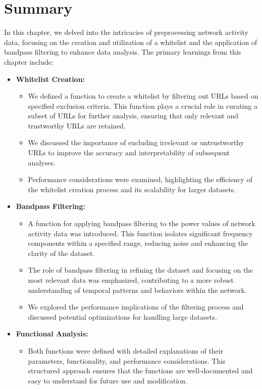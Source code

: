 \section{Summary}

In this chapter, we delved into the intricacies of preprocessing network activity data, focusing on the creation and utilization of a whitelist and the application of bandpass filtering to enhance data analysis. The primary learnings from this chapter include:

\begin{itemize}
    \item \textbf{Whitelist Creation:}
    \begin{itemize}
        \item We defined a function to create a whitelist by filtering out URLs based on specified exclusion criteria. This function plays a crucial role in curating a subset of URLs for further analysis, ensuring that only relevant and trustworthy URLs are retained.
        \item We discussed the importance of excluding irrelevant or untrustworthy URLs to improve the accuracy and interpretability of subsequent analyses.
        \item Performance considerations were examined, highlighting the efficiency of the whitelist creation process and its scalability for larger datasets.
    \end{itemize}
    \item \textbf{Bandpass Filtering:}
    \begin{itemize}
        \item A function for applying bandpass filtering to the power values of network activity data was introduced. This function isolates significant frequency components within a specified range, reducing noise and enhancing the clarity of the dataset.
        \item The role of bandpass filtering in refining the dataset and focusing on the most relevant data was emphasized, contributing to a more robust understanding of temporal patterns and behaviors within the network.
        \item We explored the performance implications of the filtering process and discussed potential optimizations for handling large datasets.
    \end{itemize}
    \item \textbf{Functional Analysis:}
    \begin{itemize}
        \item Both functions were defined with detailed explanations of their parameters, functionality, and performance considerations. This structured approach ensures that the functions are well-documented and easy to understand for future use and modification.

\end{itemize}
\end{itemize}
